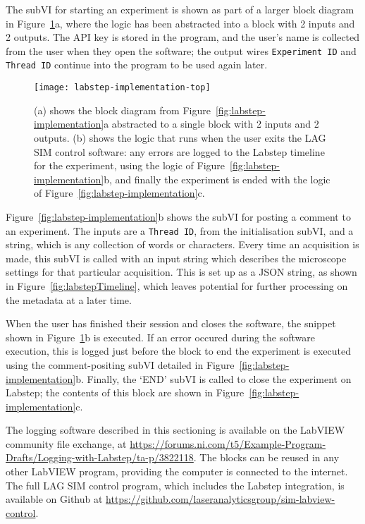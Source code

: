 The subVI for starting an experiment is shown as part of a larger block diagram in Figure~\ref{fig:labstep-implementation-top}a, where the logic has been abstracted into a block with 2 inputs and 2 outputs. 
The API key is stored in the program, and the user's name is collected from the user when they open the software; the output wires \texttt{Experiment ID} and \texttt{Thread ID} continue into the program to be used again later. 

\begin{figure}[tbp]
\centering
\texttt{[image: labstep-implementation-top]}
\caption[Top level functions for uploading to Labstep]{(a) shows the block diagram from Figure~\ref{fig:labstep-implementation}a abstracted to a single block with 2 inputs and 2 outputs. (b) shows the logic that runs when the user exits the LAG SIM control software: any errors are logged to the Labstep timeline for the experiment, using the logic of Figure~\ref{fig:labstep-implementation}b, and finally the experiment is ended with the logic of Figure~\ref{fig:labstep-implementation}c. } 
\label{fig:labstep-implementation-top}
\end{figure}

Figure~\ref{fig:labstep-implementation}b shows the subVI for posting a comment to an experiment.
The inputs are a \texttt{Thread ID}, from the initialisation subVI, and a string, which is any collection of words or characters.
Every time an acquisition is made, this subVI is called with an input string which describes the microscope settings for that particular acquisition. 
This is set up as a JSON string, as shown in Figure~\ref{fig:labstepTimeline}, which leaves potential for further processing on the metadata at a later time. 

When the user has finished their session and closes the software, the snippet shown in Figure~\ref{fig:labstep-implementation-top}b is executed. 
If an error occured during the software execution, this is logged just before the block to end the experiment is executed using the comment-positing subVI detailed in Figure~\ref{fig:labstep-implementation}b. 
Finally, the `END' subVI is called to close the experiment on Labstep; the contents of this block are shown in Figure~\ref{fig:labstep-implementation}c. 

The logging software described in this sectioning is available on the LabVIEW community file exchange, at \url{https://forums.ni.com/t5/Example-Program-Drafts/Logging-with-Labstep/ta-p/3822118}. 
The blocks can be reused in any other LabVIEW program, providing the computer is connected to the internet. 
The full LAG SIM control program, which includes the Labstep integration, is available on Github at \url{https://github.com/laseranalyticsgroup/sim-labview-control}. 

